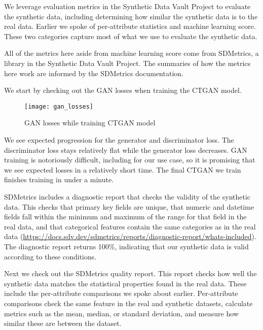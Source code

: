 \documentclass[sigconf, authorversion, nonacm]{acmart}
\begin{document}
    We leverage evaluation metrics in the Synthetic Data Vault Project to evaluate the synthetic data, including determining how similar the synthetic data is to the real data. Earlier we spoke of per-attribute statistics and machine learning score. These two categories capture most of what we use to evaluate the synthetic data.

    All of the metrics here aside from machine learning score come from SDMetrics, a library in the Synthetic Data Vault Project. The summaries of how the metrics here work are informed by the SDMetrics documentation.

    We start by checking out the GAN losses when training the CTGAN model.

    \begin{figure}[h]
        \centering
        \caption{GAN losses while training CTGAN model}
        \texttt{[image: gan\_losses]}
    \end{figure}

    We see expected progression for the generator and discriminator loss. The discriminator loss stays relatively flat while the generator loss decreases. GAN training is notoriously difficult, including for our use case, so it is promising that we see expected losses in a relatively short time. The final CTGAN we train finishes training in under a minute.

    SDMetrics includes a diagnostic report that checks the validity of the synthetic data. This checks that primary key fields are unique, that numeric and datetime fields fall within the minimum and maximum of the range for that field in the real data, and that categorical features contain the same categories as in the real data (\href{https://docs.sdv.dev/sdmetrics/reports/diagnostic-report/whats-included}{https://docs.sdv.dev/sdmetrics/reports/diagnostic-report/whats-included}). The diagnostic report returns 100\%, indicating that our synthetic data is valid according to these conditions.

    Next we check out the SDMetrics quality report. This report checks how well the synthetic data matches the statistical properties found in the real data. These include the per-attribute comparisons we spoke about earlier. Per-attribute comparisons check the same feature in the real and synthetic datasets, calculate metrics such as the mean, median, or standard deviation, and measure how similar these are between the dataset.
\end{document}

